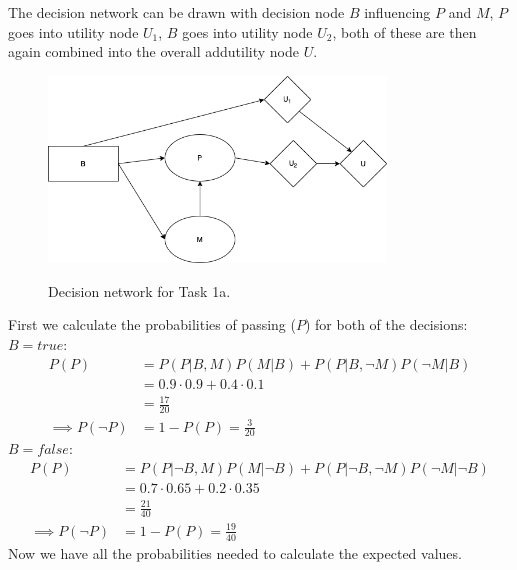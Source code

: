 \documentclass[11pt, a4paper, english]{../Template/NTNUoving}
\begin{document}
\begin{oppgave}

    \begin{punkt}
        The decision network can be drawn with decision node $B$ influencing
        $P$ and $M$, $P$ goes into utility node $U_1$, $B$ goes into utility node $U_2$,
        both of these are then again combined into the overall addutility node $U$.

        \begin{figure}[H]
            \centering
            \includegraphics[width=0.8\textwidth]{Task3_1.png}
            \label{fig:1}
            \caption{Decision network for Task 1a.}
        \end{figure}
    \end{punkt}

    \begin{punkt}

        First we calculate the probabilities of passing ($P$) for both of the decisions:
        $B=true$:
        \begin{align*}
            P(P) &= P(P|B,M)P(M|B) + P(P|B,\neg M)P(\neg M|B) \\
            &= 0.9\cdot0.9 + 0.4\cdot0.1 \\
            &= \frac{17}{20} \\
            \implies P(\neg P) &= 1-P(P) = \frac{3}{20}
        \end{align*}
        $B=false$:
        \begin{align*}
            P(P) &= P(P|\neg B,M)P(M|\neg B) + P(P|\neg B,\neg M)P(\neg M| \neg B) \\
            &= 0.7\cdot0.65 + 0.2\cdot0.35 \\
            &= \frac{21}{40} \\
            \implies P(\neg P) &= 1-P(P) = \frac{19}{40}
        \end{align*}
        Now we have all the probabilities needed to calculate the expected values.


\end{punkt}
\end{oppgave}
\end{document}
